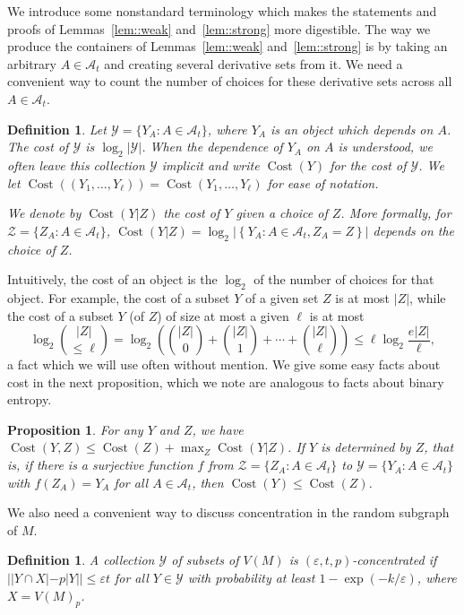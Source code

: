 \documentclass[12pt]{article}
\newcommand{\ep}{\varepsilon}
\newcommand{\A}{\mathcal{A}}
\newcommand{\Y}{\mathcal{Y}}
\newcommand{\Z}{\mathcal{Z}}
\DeclareMathOperator{\cost}{Cost}
\newtheorem{definition}[theorem]{Definition}
\newtheorem{proposition}[theorem]{Proposition}
\begin{document}
We introduce some nonstandard terminology which makes the statements and proofs of Lemmas~\ref{lem::weak} and~\ref{lem::strong} more digestible. The way we produce the containers of Lemmas~\ref{lem::weak} and~\ref{lem::strong} is by taking an arbitrary $A \in \A_t$ and creating several derivative sets from it. We need a convenient way to count the number of choices for these derivative sets across all $A \in \A_t$.
\begin{definition}
Let $\Y = \{Y_A : A \in \A_t\}$, where $Y_A$ is an object which depends on $A$. The \emph{cost} of $\Y$ is $\log_2|\Y|$. When the dependence of $Y_A$ on $A$ is understood, we often leave this collection $\Y$ implicit and write $\cost(Y)$ for the cost of $\Y$. We let $\cost((Y_1, \dots, Y_\ell)) = \cost(Y_1, \dots, Y_\ell)$ for ease of notation.

We denote by $\cost(Y|Z)$ the cost of $Y$ given a choice of $Z$. More formally, for $\Z = \{Z_A : A \in \A_t\}$, $\cost(Y|Z) = \log_2\left|\left\{ Y_A : A \in \A_t, Z_A = Z \right\}\right|$ depends on the choice of $Z$.
\end{definition}
Intuitively, the cost of an object is the $\log_2$ of the number of choices for that object. For example, the cost of a subset $Y$ of a given set $Z$ is at most $|Z|$, while the cost of a subset $Y$ (of $Z$) of size at most a given $\ell$ is at most
\[ \log_2 \binom{|Z|}{\leq \ell} = \log_2\left( \binom{|Z|}{0} + \binom{|Z|}{1} + \cdots + \binom{|Z|}{\ell} \right) \leq \ell \log_2 \frac{e|Z|}{\ell} ,\]
a fact which we will use often without mention. We give some easy facts about cost in the next proposition, which we note are analogous to facts about binary entropy.

\begin{proposition}\label{prop::costfacts}
For any $Y$ and $Z$, we have $\cost(Y,Z) \leq \cost(Z) + \max_Z \cost(Y|Z)$. If $Y$ is determined by $Z$, that is, if there is a surjective function $f$ from $\Z = \{Z_A : A \in \A_t\}$ to $\Y = \{Y_A : A \in \A_t\}$ with $f(Z_A) = Y_A$ for all $A \in \A_t$, then $\cost(Y) \leq \cost(Z)$.
\end{proposition}

We also need a convenient way to discuss concentration in the random subgraph of $M$.
\begin{definition}
A collection $\Y$ of subsets of $V(M)$ is \emph{$(\ep,t,p)$-concentrated} if $||Y \cap X|-p|Y|| \leq \ep t$ for all $Y \in \Y$ with probability at least $1-\exp(-k/\ep)$, where $X = V(M)_p$.
\end{definition}
\end{document}
